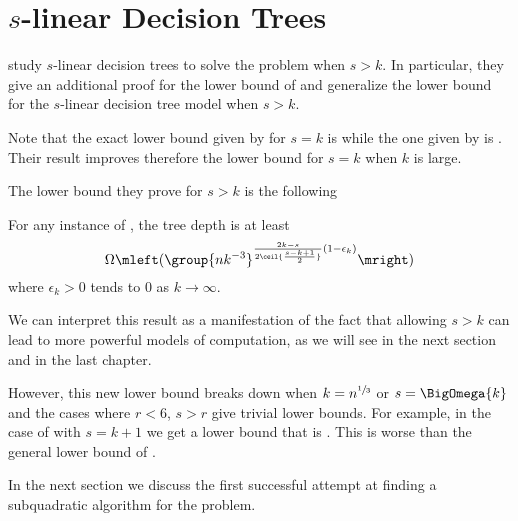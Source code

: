 \section{$s$-linear Decision Trees}

\citet*{ailon:2005} study $s$-linear decision trees to solve the \kSUM
problem when $s > k$. In particular, they give an additional proof for the
 lower bound of \citet{erickson:1999} and
generalize the lower bound for the \(s\)-linear decision tree model when $s > k$.

Note that the exact lower bound given by \citet*{erickson:1999} for \(s = k\) is
 while the one given by
\citet*{ailon:2005} is . Their result
improves therefore the lower bound for \(s = k\) when \(k\) is large.

The lower bound they prove for \(s > k\) is the following
\begin{theorem}
For any instance of \kLDT, the tree depth is at least
\begin{displaymath}
\Omega\mleft(\group{nk^{-3}}^{\frac{2k-s}{2\ceil{\frac{s-k+1}{2}}}
(1-\epsilon_k) }\mright)
\end{displaymath}
where \(\epsilon_k > 0\) tends to \(0\) as \(k \to\infty\).
\end{theorem}

We can interpret this result as a manifestation of the fact that allowing \(s >
k\) can lead to more powerful models of computation, as we will see in the next
section and in the last chapter.

However, this new lower bound breaks down when
\(k = n^{\sfrac{1}{3}}\) or \(s = \BigOmega{k}\) and the cases where \(r <
6\), \(s > r\) give trivial lower bounds. For example, in the case
of \threeSUM with \(s = k + 1\) we get a lower bound that is . This is
worse than the general lower bound of .

In the next section we discuss the first successful attempt at finding
a subquadratic algorithm for the \threeSUM problem.
